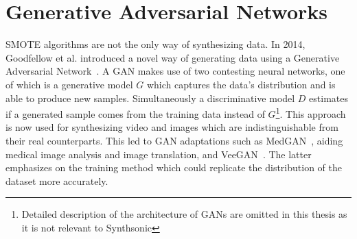 \section{Generative Adversarial Networks}
SMOTE algorithms are not the only way of synthesizing data. In 2014, Goodfellow et al. introduced a novel way of generating data using a Generative Adversarial Network~\cite{Goodfellow2014GenerativeNets}. A GAN makes use of two contesting neural networks, one of which is a generative model $G$ which captures the data's distribution and is able to produce new samples. Simultaneously a discriminative model $D$ estimates if a generated sample comes from the training data instead of $G$\footnote{Detailed description of the architecture of GANs are omitted in this thesis as it is not relevant to Synthsonic}. This approach is now used for synthesizing video and images which are indistinguishable from their real counterparts. This led to GAN adaptations such as MedGAN~\cite{Armanious2018MedGAN:GANs}, aiding medical image analysis and image translation, and VeeGAN~\cite{Srivastava2017VEEGAN:Learning}. The latter emphasizes on the training method which could replicate the distribution of the dataset more accurately.